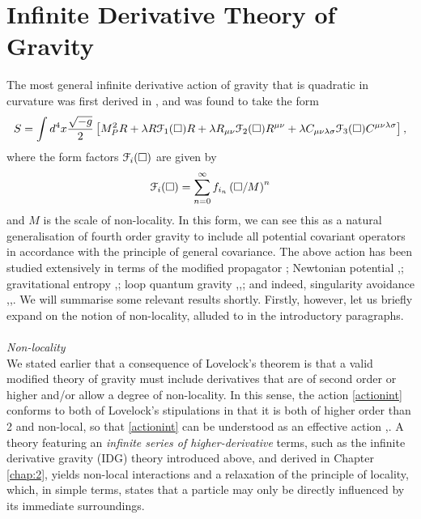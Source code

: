 \section{Infinite Derivative Theory of Gravity}
\label{sec:IDGintro}
The most general infinite derivative action of gravity that is quadratic in curvature was first derived in \cite{Biswas:2005qr}, and was found to take the form
\[
\label{actionint}
S=\int d^4x\frac{\sqrt{-g}}{2}\left[M_P^2R+ \lambda R{\cal F}_1(\Box)R
+\lambda R_{\mu\nu} {\cal F}_2(\Box)R^{\mu\nu}
+\lambda C_{\mu\nu\lambda\sigma} {\cal F}_{3}(\Box)C^{\mu\nu\lambda\sigma}\right],
\]
where the form factors ${\cal F}_i(\Box)$ are given by
\[
{\cal F}_i(\Box)=\sum^{\infty}_{n=0}f_{i_n}\left(\Box/M\right)^n
\]
and $M$ is the scale of non-locality. 
In this form, we can see this as a natural generalisation of fourth order gravity to include all potential covariant operators in accordance with the principle of general covariance.
The above action has been studied extensively in terms of the modified propagator \cite{Biswas:2013kla}; Newtonian potential \cite{Edholm:2016hbt},\cite{Biswas:2011ar}; gravitational entropy \cite{Conroy:2015wfa},\cite{Conroy:2015nva}; loop quantum gravity \cite{Talaganis:2014ida},\cite{Talaganis:2015wva},\cite{Talaganis:2016ovm}; and indeed, singularity avoidance \cite{Conroy:2016sac},\cite{Conroy:2014dja},\cite{Frolov:2016pav}. We will summarise some relevant results shortly. Firstly, however, let us briefly expand on the notion of non-locality, alluded to in the introductory paragraphs.
\\\\\emph{Non-locality} \\
We stated earlier that a consequence of Lovelock's theorem is that a valid modified theory of gravity must include derivatives that are of second order or higher and/or allow a degree of non-locality. In this sense, the action \eqref{actionint} conforms to both of Lovelock's stipulations in that it is both of higher order than 2 and non-local, so that \eqref{actionint} can be understood as an effective action \cite{Biswas:2005qr},\cite{Barvinsky:2002uf}.  A theory featuring an \emph{infinite series of higher-derivative} terms, such as the infinite derivative gravity (IDG) theory introduced above, and derived in Chapter \ref{chap:2}, yields non-local interactions and a relaxation of the principle of locality, which, in simple terms, states that a particle may only be directly influenced by its immediate surroundings.

